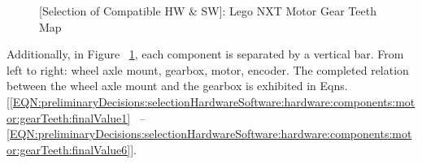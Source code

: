 \documentclass[crop=false,float=true,class=scrreprt]{standalone}
\begin{document}
\vspace*{\fill}
\begin{figure}[H]
\setcounter{MaxMatrixCols}{20}
\centering%
%
\caption[{[Selection of Compatible HW \& SW]: Lego NXT Motor Gear Teeth Map}]%
        {{[Selection of Compatible HW \& SW]: Lego NXT Motor Gear Teeth Map~%
           \cite{REF:online:philohome}%
           \label{FIG:preliminaryDecisions:selectionHardwareSoftware:hardware:components:motor:gearTeethMap}%
           }}%
\end{figure}
\vspace*{\fill}




\clearpage




Additionally, in Figure~%
\ref{FIG:preliminaryDecisions:selectionHardwareSoftware:hardware:components:motor:gearTeethMap},
each component is separated by a vertical bar.
From left to right: wheel axle mount, gearbox, motor, encoder.
The completed relation between the wheel axle mount and the gearbox is exhibited in Eqns.
[\ref{EQN:preliminaryDecisions:selectionHardwareSoftware:hardware:components:motor:gearTeeth:finalValue1}~%
--%
\ref{EQN:preliminaryDecisions:selectionHardwareSoftware:hardware:components:motor:gearTeeth:finalValue6}].
\end{document}
